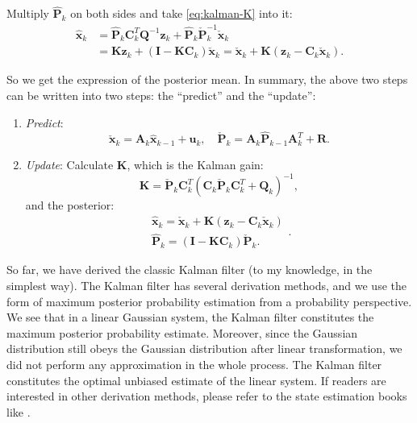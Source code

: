Multiply $\mathbf{\hat{P}}_k$ on both sides and take \eqref{eq:kalman-K} into it:
\begin{align}
	{{\mathbf{\hat {x}}}_k} &= {{\hat {\mathbf{P}}}_k} \mathbf{C}_k^T { \mathbf{Q}^{ - 1}}{\mathbf{z}_k} + {{\mathbf{\hat{ P}}}_k}\check {\mathbf{P}}_k^{ - 1}{{\check {\mathbf{x}}}_k}\\
	&= \mathbf{K} {\mathbf{z}_k} + \left( {\mathbf{I} - \mathbf{K}{\mathbf{C}_k}} \right){{\mathbf{\check {x}}}_k} = {{\check {\mathbf{x}}}_k} + \mathbf{K} \left( {\mathbf{z}_k - {\mathbf{C}_k}{\mathbf{\check{x}}_k}} \right).
\end{align}

So we get the expression of the posterior mean. In summary, the above two steps can be written into two steps:  the ``predict'' and the ``update'':
\begin{mdframed}
	\begin{enumerate}
		\item \textit{Predict}:
		\begin{equation}
			\check{\mathbf{x}}_k = {\mathbf{A}_k {{\hat{\mathbf{x}}}_{k - 1}} + {\mathbf{u}_k}}, \quad \check{\mathbf{P}}_k = {\mathbf{A}_k \hat{\mathbf{P}}_{k-1} { \mathbf{A}^T_k} + \mathbf{R}}.
		\end{equation}
		\item \textit{Update}:
		Calculate $\mathbf{K}$, which is the Kalman gain:
		\begin{equation}
			\label{eq:kalman-K-another}
			\mathbf{K} = {{\check {\mathbf{P}}}_k} \mathbf{C}_k^T {\left( {{\mathbf{C}_k}{{\check {\mathbf{P}}}_k}\mathbf{C}_k^T + {\mathbf{Q}_k}} \right)^{ - 1}},
		\end{equation}
		and the posterior:
		\begin{equation}
			\begin{array}{l}
				\hat {\mathbf{x}}_k = {{\check {\mathbf{x}}}_k} + \mathbf{K} \left( {\mathbf{z}_k - {\mathbf{C}_k}{\mathbf{\check{x}}_k}} \right)\\
				{{\mathbf{\hat {P}}}_k} = \left( {\mathbf{I} - \mathbf{K}{\mathbf{C}_k}} \right) \check{\mathbf{P}}_k.
			\end{array}.
		\end{equation}
	\end{enumerate}
\end{mdframed}

So far, we have derived the classic Kalman filter (to my knowledge, in the simplest way). The Kalman filter has several derivation methods, and we use the form of maximum posterior probability estimation from a probability perspective. We see that in a linear Gaussian system, the Kalman filter constitutes the maximum posterior probability estimate. Moreover, since the Gaussian distribution still obeys the Gaussian distribution after linear transformation, we did not perform any approximation in the whole process. The Kalman filter constitutes the optimal unbiased estimate of the linear system. If readers are interested in other derivation methods, please refer to the state estimation books like \cite{Barfoot2016}. 

